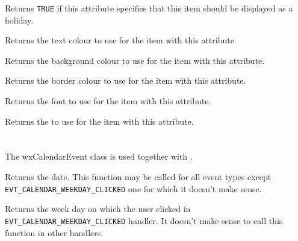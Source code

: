 \label{wxcalendardateattrisholiday}


Returns {\tt TRUE} if this attribute specifies that this item should be
displayed as a holiday.

\label{wxcalendardateattrgettextcolour}


Returns the text colour to use for the item with this attribute.

\label{wxcalendardateattrgetbackgroundcolour}


Returns the background colour to use for the item with this attribute.

\label{wxcalendardateattrgetbordercolour}


Returns the border colour to use for the item with this attribute.

\label{wxcalendardateattrgetfont}


Returns the font to use for the item with this attribute.

\label{wxcalendardateattrgetborder}


Returns the  to use for the item with this attribute.

\section{}\label{wxcalendarevent}

The wxCalendarEvent class is used together with 
.






Returns the date. This function may be called for all event types except 
{\tt EVT\_CALENDAR\_WEEKDAY\_CLICKED} one for which it doesn't make sense.



Returns the week day on which the user clicked in 
{\tt EVT\_CALENDAR\_WEEKDAY\_CLICKED} handler. It doesn't make sense to call
this function in other handlers.
